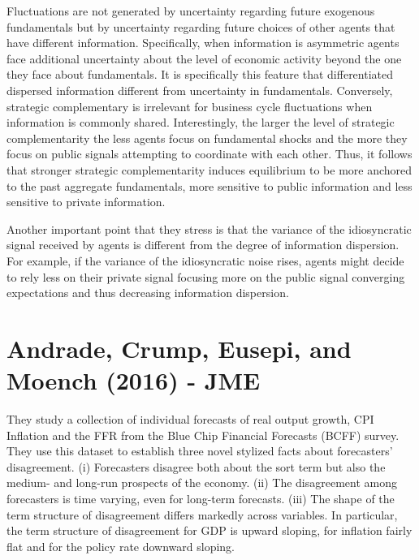 \documentclass{article}
\begin{document}
{Fluctuations are not generated by uncertainty regarding future exogenous fundamentals but by uncertainty regarding future choices of other agents that have different information. Specifically, when information is asymmetric agents face additional uncertainty about the level of economic activity beyond the one they face about fundamentals. It is specifically this feature that differentiated dispersed information different from uncertainty in fundamentals. Conversely, strategic complementary is irrelevant for business cycle fluctuations when information is commonly shared. Interestingly, the larger the level of strategic complementarity the less agents focus on fundamental shocks and the more they focus on public signals attempting to coordinate with each other. Thus, it follows that stronger strategic complementarity induces equilibrium to be more anchored to the past aggregate fundamentals, more sensitive to public information and less sensitive to private information.

Another important point that they stress is that the variance of the idiosyncratic signal received by agents is different from the degree of information dispersion. For example, if the variance of the idiosyncratic noise rises, agents might decide to rely less on their private signal focusing more on the public signal converging expectations and thus decreasing information dispersion. 


\section*{Andrade, Crump, Eusepi, and Moench (2016) - JME}

They study a collection of individual forecasts of real output growth, CPI Inflation and the FFR from the Blue Chip Financial Forecasts (BCFF) survey. They use this dataset to establish three novel stylized facts about forecasters' disagreement. (i) Forecasters disagree both about the sort term but also the medium- and long-run prospects of the economy. (ii) The disagreement among forecasters is time varying, even for long-term forecasts. (iii) The shape of the term structure of disagreement differs markedly across variables. In particular, the term structure of disagreement for GDP is upward sloping, for inflation fairly flat and for the policy rate downward sloping. 

}
\end{document}

